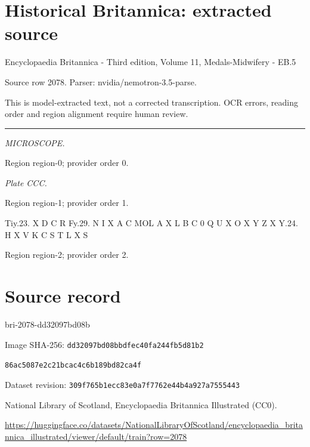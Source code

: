 \documentclass[11pt]{article}
\begin{document}
\section*{Historical Britannica: extracted source}
Encyclopaedia Britannica - Third edition, Volume 11, Medals-Midwifery - EB.5\par
{\small Source row 2078. Parser: nvidia/nemotron-3.5-parse.\par}
{\small This is model-extracted text, not a corrected transcription. OCR errors, reading order and region alignment require human review.\par}
\hrule\medskip
{\small\itshape MICROSCOPE.\par}

{\scriptsize\color{gray} Region region-0; provider order 0.\par}
\medskip

{\small\itshape Plate CCC.\par}

{\scriptsize\color{gray} Region region-1; provider order 1.\par}
\medskip

Tiy.23.
X
D C
R
Fy.29.
N
I
X
A
C
MOL A X
L
B
C
0
Q
U
X
O
X
Y
Z
X
Y.24.
H
X
V
K
C
S
T
L
X
S
\par

{\scriptsize\color{gray} Region region-2; provider order 2.\par}
\medskip
\newpage\section*{Source record}
bri-2078-dd32097bd08b\par
Image SHA-256: \texttt{dd32097bd08bbdfec40fa244fb5d81b2}\par\texttt{86ac5087e2c21bcac4c6b189bd82ca4f}\par
Dataset revision: \texttt{309f765b1ecc83e0a7f7}\texttt{762e44b4a927a7555443}\par
National Library of Scotland, Encyclopaedia Britannica Illustrated (CC0).\par
\url{https://huggingface.co/datasets/NationalLibraryOfScotland/encyclopaedia_britannica_illustrated/viewer/default/train?row=2078}
\end{document}

